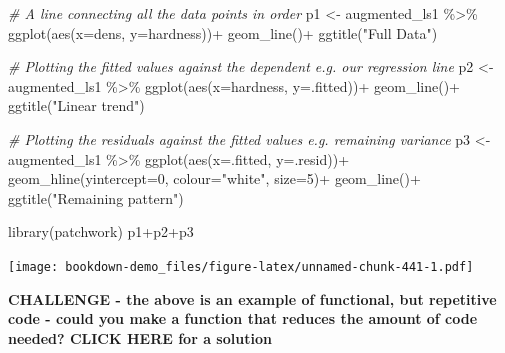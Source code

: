 \documentclass[
]{book}
\newenvironment{Shaded}{\begin{snugshade}}{\end{snugshade}}
\newcommand{\AttributeTok}[1]{\textcolor[rgb]{0.77,0.63,0.00}{#1}}
\newcommand{\CommentTok}[1]{\textcolor[rgb]{0.56,0.35,0.01}{\textit{#1}}}
\newcommand{\DecValTok}[1]{\textcolor[rgb]{0.00,0.00,0.81}{#1}}
\newcommand{\FunctionTok}[1]{\textcolor[rgb]{0.00,0.00,0.00}{#1}}
\newcommand{\NormalTok}[1]{#1}
\newcommand{\OtherTok}[1]{\textcolor[rgb]{0.56,0.35,0.01}{#1}}
\newcommand{\SpecialCharTok}[1]{\textcolor[rgb]{0.00,0.00,0.00}{#1}}
\newcommand{\StringTok}[1]{\textcolor[rgb]{0.31,0.60,0.02}{#1}}
\begin{document}
\begin{Shaded}
\begin{Highlighting}[]
\CommentTok{\# A line connecting all the data points in order }
\NormalTok{p1 }\OtherTok{\textless{}{-}}\NormalTok{ augmented\_ls1 }\SpecialCharTok{\%\textgreater{}\%} 
  \FunctionTok{ggplot}\NormalTok{(}\FunctionTok{aes}\NormalTok{(}\AttributeTok{x=}\NormalTok{dens, }\AttributeTok{y=}\NormalTok{hardness))}\SpecialCharTok{+}
  \FunctionTok{geom\_line}\NormalTok{()}\SpecialCharTok{+}
  \FunctionTok{ggtitle}\NormalTok{(}\StringTok{"Full Data"}\NormalTok{)}

\CommentTok{\# Plotting the fitted values against the dependent e.g. our regression line}
\NormalTok{p2 }\OtherTok{\textless{}{-}}\NormalTok{ augmented\_ls1 }\SpecialCharTok{\%\textgreater{}\%} 
  \FunctionTok{ggplot}\NormalTok{(}\FunctionTok{aes}\NormalTok{(}\AttributeTok{x=}\NormalTok{hardness, }\AttributeTok{y=}\NormalTok{.fitted))}\SpecialCharTok{+}
  \FunctionTok{geom\_line}\NormalTok{()}\SpecialCharTok{+}
  \FunctionTok{ggtitle}\NormalTok{(}\StringTok{"Linear trend"}\NormalTok{)}

\CommentTok{\# Plotting the residuals against the fitted values e.g. remaining variance}
\NormalTok{p3 }\OtherTok{\textless{}{-}}\NormalTok{ augmented\_ls1 }\SpecialCharTok{\%\textgreater{}\%} 
  \FunctionTok{ggplot}\NormalTok{(}\FunctionTok{aes}\NormalTok{(}\AttributeTok{x=}\NormalTok{.fitted, }\AttributeTok{y=}\NormalTok{.resid))}\SpecialCharTok{+}
  \FunctionTok{geom\_hline}\NormalTok{(}\AttributeTok{yintercept=}\DecValTok{0}\NormalTok{, }\AttributeTok{colour=}\StringTok{"white"}\NormalTok{, }\AttributeTok{size=}\DecValTok{5}\NormalTok{)}\SpecialCharTok{+}
  \FunctionTok{geom\_line}\NormalTok{()}\SpecialCharTok{+}
  \FunctionTok{ggtitle}\NormalTok{(}\StringTok{"Remaining pattern"}\NormalTok{)}


\FunctionTok{library}\NormalTok{(patchwork)}
\NormalTok{p1}\SpecialCharTok{+}\NormalTok{p2}\SpecialCharTok{+}\NormalTok{p3}
\end{Highlighting}
\end{Shaded}

\texttt{[image: bookdown-demo\_files/figure-latex/unnamed-chunk-441-1.pdf]}

\textbf{CHALLENGE - the above is an example of functional, but repetitive code - could you make a function that reduces the amount of code needed? CLICK HERE for a solution}
\end{document}
